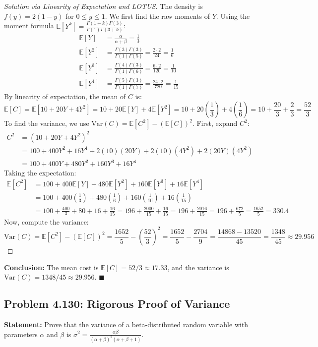 \documentclass[11pt, a4paper]{article}
\theoremstyle{definition}
\theoremstyle{remark}
\newcommand{\E}{\mathbb{E}}
\begin{document}
\begin{proof}[Solution via Linearity of Expectation and LOTUS]
The density is $f(y) = 2(1-y)$ for $0 \le y \le 1$. We first find the raw moments of $Y$.
Using the moment formula $\E[Y^k] = \frac{\Gamma(1+k)\Gamma(3)}{\Gamma(1)\Gamma(3+k)}$:
\begin{align*}
\E[Y] &= \frac{\alpha}{\alpha+\beta} = \frac{1}{3} \\
\E[Y^2] &= \frac{\Gamma(3)\Gamma(3)}{\Gamma(1)\Gamma(5)} = \frac{2 \cdot 2}{24} = \frac{1}{6} \\
\E[Y^3] &= \frac{\Gamma(4)\Gamma(3)}{\Gamma(1)\Gamma(6)} = \frac{6 \cdot 2}{120} = \frac{1}{10} \\
\E[Y^4] &= \frac{\Gamma(5)\Gamma(3)}{\Gamma(1)\Gamma(7)} = \frac{24 \cdot 2}{720} = \frac{1}{15}
\end{align*}
By linearity of expectation, the mean of $C$ is:
\[
\E[C] = \E[10 + 20Y + 4Y^2] = 10 + 20\E[Y] + 4\E[Y^2] = 10 + 20\left(\frac{1}{3}\right) + 4\left(\frac{1}{6}\right) = 10 + \frac{20}{3} + \frac{2}{3} = \frac{52}{3}
\]
To find the variance, we use $\text{Var}(C) = \E[C^2] - (\E[C])^2$. First, expand $C^2$:
\begin{align*}
C^2 &= (10 + 20Y + 4Y^2)^2 \\
&= 100 + 400Y^2 + 16Y^4 + 2(10)(20Y) + 2(10)(4Y^2) + 2(20Y)(4Y^2) \\
&= 100 + 400Y + 480Y^2 + 160Y^3 + 16Y^4
\end{align*}
Taking the expectation:
\begin{align*}
\E[C^2] &= 100 + 400\E[Y] + 480\E[Y^2] + 160\E[Y^3] + 16\E[Y^4] \\
&= 100 + 400\left(\frac{1}{3}\right) + 480\left(\frac{1}{6}\right) + 160\left(\frac{1}{10}\right) + 16\left(\frac{1}{15}\right) \\
&= 100 + \frac{400}{3} + 80 + 16 + \frac{16}{15} = 196 + \frac{2000}{15} + \frac{16}{15} = 196 + \frac{2016}{15} = 196 + \frac{672}{5} = \frac{1652}{5} = 330.4
\end{align*}
Now, compute the variance:
\[
\text{Var}(C) = \E[C^2] - (\E[C])^2 = \frac{1652}{5} - \left(\frac{52}{3}\right)^2 = \frac{1652}{5} - \frac{2704}{9} = \frac{14868 - 13520}{45} = \frac{1348}{45} \approx 29.956
\]
\end{proof}
\textbf{Conclusion:} The mean cost is $\E[C] = 52/3 \approx 17.33$, and the variance is $\text{Var}(C) = 1348/45 \approx 29.956$. $\blacksquare$

\subsection{Problem 4.130: Rigorous Proof of Variance}
\textbf{Statement:} Prove that the variance of a beta-distributed random variable with parameters $\alpha$ and $\beta$ is $\sigma^2 = \frac{\alpha\beta}{(\alpha+\beta)^2(\alpha+\beta+1)}$.
\end{document}
